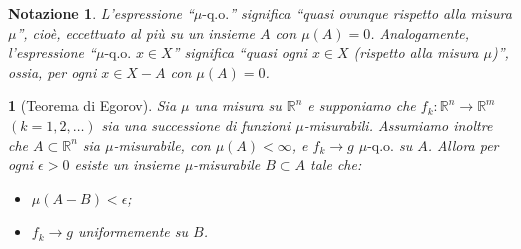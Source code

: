 \documentclass[a4paper,10pt,openright,oneside]{book}
\theoremstyle{theoremstyle}
\theoremstyle{theoremstylewoheader}
\newtheorem{teorema2}[teorema]{}
\theoremstyle{theoremstyle}
\newtheorem{notazione}[teorema]{Notazione}
\theoremstyle{proofsecstyle}
\theoremstyle{nonumberplain}
\newcommand{\RR}{\ensuremath{\mathbb{R}}}
\newcommand{\qo}[1]{\ensuremath{#1\text{-q.o.}}}
\newcommand{\qogni}[2]{\ensuremath{#2\text{-q.o. $\!#1$}}}
\begin{document}
\begin{notazione}
L'espressione ``$\qo{\mu}$'' significa ``quasi ovunque rispetto alla misura $\mu$'', cioè, eccettuato al più su un insieme $A$ con $\mu(A) = 0$. Analogamente, l'espressione ``$\qogni{x \in X}{\mu}$'' significa ``quasi ogni $x \in X$ (rispetto alla misura $\mu$)'', ossia, per ogni $x \in X - A$ con $\mu(A) = 0$. 
\end{notazione}

\begin{teorema2}[Teorema di Egorov]
\label{thm:egorov}
Sia $\mu$ una misura su $\RR^n$ e supponiamo che $f_k : \RR^n \rightarrow \RR^m$ $(k = 1, 2, \ldots)$ sia una successione di funzioni $\mu$-misurabili. Assumiamo inoltre che $A \subset \RR^n$ sia $\mu$-misurabile, con $\mu(A) < \infty$, e $f_k \to g$ $\qo{\mu}$ su $A$. Allora per ogni $\epsilon > 0$ esiste un insieme $\mu$-misurabile $B \subset A$ tale che:
\begin{itemize}
\item[(i)] $\mu(A - B) < \epsilon$;
\item[(ii)] $f_k \to g$ uniformemente su $B$.
\end{itemize}
\end{teorema2}
\end{document}
